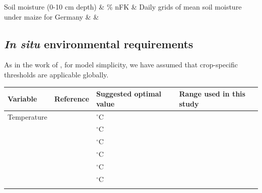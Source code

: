 \documentclass[10pt,authoryear]{elsarticle}
\begin{document}
{\begin{table}[ht]
\begin{tabular}
				Soil moisture (0-10 cm depth) &
				\% nFK &
				Daily grids of mean soil moisture under maize for Germany &
				&
				\\ \hline
				
			\end{tabular}
			\caption{Environmental variables used in this study, including their measurement units, source datasets, frequency of data reports, and study period. *Raw values must be divided by ten to get the correct unit of $^\circ$C \citep{DWD_soiltemperature}.}
			\label{table:Vars}
		\end{table}
		
		
		\subsection{\textit{In situ} environmental requirements}
		
		As in the work of \cite{Waha_2011}, for model simplicity, we have assumed that crop-specific thresholds are applicable globally.
		
		\begin{table}[ht]
			\small
			\centering
			\begin{tabular}{>{\raggedright\arraybackslash}p{3.5cm}
					|>{\raggedright\arraybackslash}p{4.5cm}
					|>{\centering\arraybackslash}p{3.0cm}
					|>{\centering\arraybackslash}p{3.0cm}}
				\hline
				\textbf{Variable} &
				\textbf{Reference} &
				\textbf{Suggested optimal value} &
				\textbf{Range used in this study} \\ \hline
				
				Temperature &
				\cite{Birch_1998} &
				8 $^\circ$C &
				\multirow{8}{=}{$11.10\pm2.5116$} \\ \cline{2-3}
				
				&
				\cite{Coffman_1923} &
				10 $^\circ$C &
				\\ \cline{2-3}
				
				&
				\cite{Grubben_1997} &
				10 $^\circ$C &
				\\ \cline{2-3}
				
				&
				\cite{Kiniry_1995} &
				12.8 $^\circ$C &
				\\ \cline{2-3}
				
				&
				\cite{Pan_1999} &
				10 $^\circ$C &
				\\ \cline{2-3}
				
				&
				\cite{Vatca_2021} &
				15 $^\circ$C &
				\\ \cline{2-3}
				

\end{tabular}
\end{table}}
\end{document}
